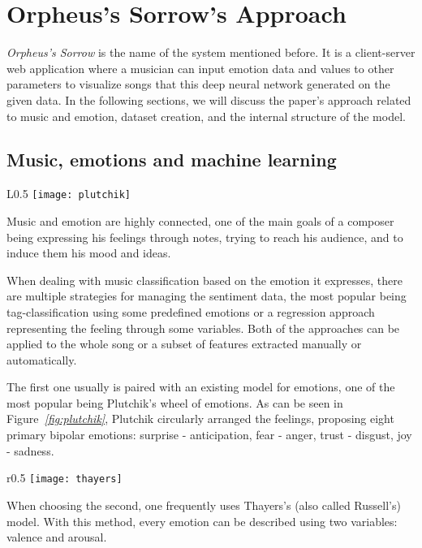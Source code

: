 \section{Orpheus's Sorrow's Approach}
\emph{Orpheus's Sorrow} is the name of the system mentioned before.
It is a client-server web application where a musician can input
emotion data and values to other parameters to visualize songs that this deep
neural network generated on the given data.
In the following sections,
we will discuss the paper's approach related to music and emotion,
dataset creation, and the internal structure of the model.


\subsection{Music, emotions and machine learning}
\begin{wrapfigure}{L}{0.5\textwidth}
      \centering
      \texttt{[image: plutchik]}
      \caption{\emph{Plutchik's wheel/cone of emotions \cite{plutchik}}}
      \label{fig:plutchik}
\end{wrapfigure}
Music and emotion are highly connected,
one of the main goals of a composer being expressing his feelings through notes,
trying to reach his audience, and to induce them his mood and ideas.


When dealing with music classification based on the emotion it expresses,
there are multiple strategies for managing the sentiment data,
the most popular being tag-classification using some predefined emotions
or a regression approach representing the feeling through some variables.
Both of the approaches can be applied to the whole song or a subset of
features extracted manually or automatically.


The first one usually is paired with an existing model for emotions,
one of the most popular being Plutchik's wheel of emotions.
As can be seen in Figure\emph{~\ref{fig:plutchik}},
Plutchik circularly arranged the feelings,
proposing eight primary bipolar emotions:
surprise - anticipation, fear - anger, trust - disgust, joy - sadness.


\begin{wrapfigure}[10]{r}{0.5\textwidth}
      \centering
      \texttt{[image: thayers]}
      \caption{\emph{Thayer's Model for Emotions (also named Russel's model) \cite{plutchik}}}
      \label{fig:thayers}
\end{wrapfigure}

When choosing the second, one frequently uses Thayers's
(also called Russell's) model. With this method,
every emotion can be described using two variables: valence and arousal.


